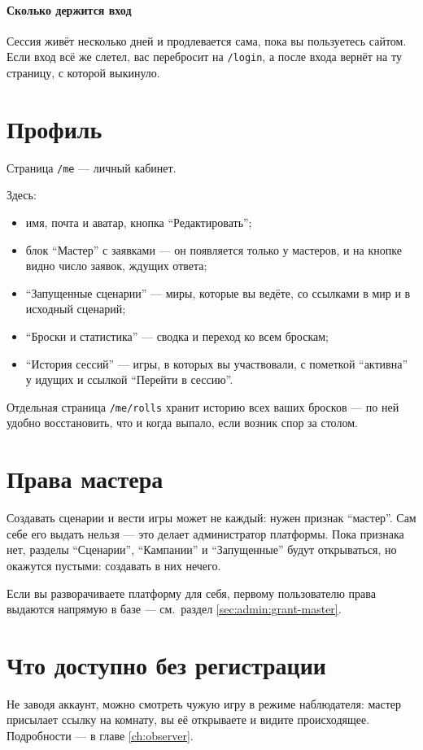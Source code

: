 \paragraph{Сколько держится вход}
Сессия живёт несколько дней и продлевается сама, пока вы пользуетесь сайтом. Если вход всё же слетел, вас перебросит на \texttt{/login}, а после входа вернёт на ту страницу, с которой выкинуло.

\section{Профиль}
\label{sec:getting-started:profile}

Страница \texttt{/me} --- личный кабинет.


Здесь:

\begin{itemize}
\item имя, почта и аватар, кнопка ``Редактировать'';
\item блок ``Мастер'' с заявками --- он появляется только у мастеров, и на кнопке видно число заявок, ждущих ответа;
\item ``Запущенные сценарии'' --- миры, которые вы ведёте, со ссылками в мир и в исходный сценарий;
\item ``Броски и статистика'' --- сводка и переход ко всем броскам;
\item ``История сессий'' --- игры, в которых вы участвовали, с пометкой ``активна'' у идущих и ссылкой ``Перейти в сессию''.
\end{itemize}

Отдельная страница \texttt{/me/rolls} хранит историю всех ваших бросков --- по ней удобно восстановить, что и когда выпало, если возник спор за столом.

\section{Права мастера}
\label{sec:getting-started:master-rights}

Создавать сценарии и вести игры может не каждый: нужен признак ``мастер''. Сам себе его выдать нельзя --- это делает администратор платформы. Пока признака нет, разделы ``Сценарии'', ``Кампании'' и ``Запущенные'' будут открываться, но окажутся пустыми: создавать в них нечего.

Если вы разворачиваете платформу для себя, первому пользователю права выдаются напрямую в базе --- см.\ раздел \ref{sec:admin:grant-master}.

\section{Что доступно без регистрации}
\label{sec:getting-started:anonymous}

Не заводя аккаунт, можно смотреть чужую игру в режиме наблюдателя: мастер присылает ссылку на комнату, вы её открываете и видите происходящее. Подробности --- в главе \ref{ch:observer}.
